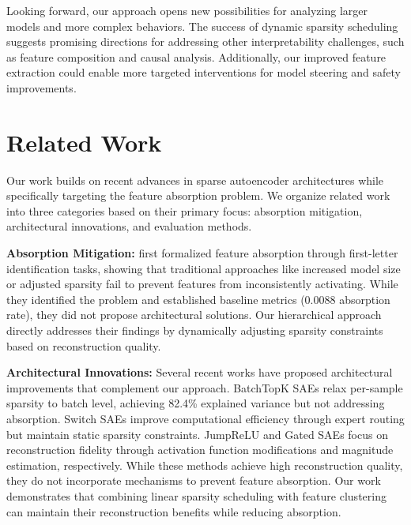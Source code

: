 \documentclass{article} %
\begin{document}
Looking forward, our approach opens new possibilities for analyzing larger models and more complex behaviors. The success of dynamic sparsity scheduling suggests promising directions for addressing other interpretability challenges, such as feature composition and causal analysis. Additionally, our improved feature extraction could enable more targeted interventions for model steering and safety improvements.

\section{Related Work}
\label{sec:related}

Our work builds on recent advances in sparse autoencoder architectures while specifically targeting the feature absorption problem. We organize related work into three categories based on their primary focus: absorption mitigation, architectural innovations, and evaluation methods.

\textbf{Absorption Mitigation:} \cite{chaninAbsorptionStudyingFeature2024} first formalized feature absorption through first-letter identification tasks, showing that traditional approaches like increased model size or adjusted sparsity fail to prevent features from inconsistently activating. While they identified the problem and established baseline metrics (0.0088 absorption rate), they did not propose architectural solutions. Our hierarchical approach directly addresses their findings by dynamically adjusting sparsity constraints based on reconstruction quality.

\textbf{Architectural Innovations:} Several recent works have proposed architectural improvements that complement our approach. BatchTopK SAEs \cite{bussmannBatchTopKSparseAutoencoders2024} relax per-sample sparsity to batch level, achieving 82.4\% explained variance but not addressing absorption. Switch SAEs \cite{mudideEfficientDictionaryLearning2024a} improve computational efficiency through expert routing but maintain static sparsity constraints. JumpReLU \cite{rajamanoharanJumpingAheadImproving2024} and Gated SAEs \cite{rajamanoharanImprovingDictionaryLearning2024} focus on reconstruction fidelity through activation function modifications and magnitude estimation, respectively. While these methods achieve high reconstruction quality, they do not incorporate mechanisms to prevent feature absorption. Our work demonstrates that combining linear sparsity scheduling with feature clustering can maintain their reconstruction benefits while reducing absorption.
\end{document}

